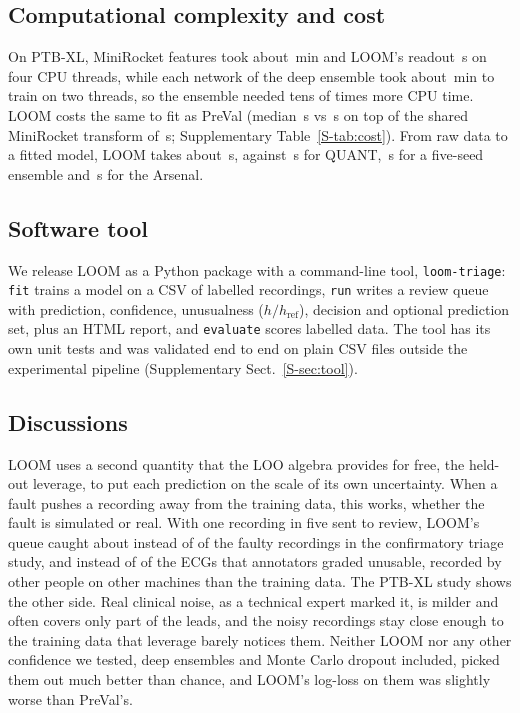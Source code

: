 \documentclass[preprint,12pt,authoryear]{elsarticle}
\begin{document}
\subsection{Computational complexity and cost}\label{sec:cost}
On PTB-XL, MiniRocket features took about \PTBTimeTransform\,min and LOOM's readout \PTBTimeLoom\,s on four CPU threads, while each network of the deep ensemble took about \DeepTrainMin\,min to train on two threads, so the ensemble needed tens of times more CPU time. LOOM costs the same to fit as PreVal (median \FitLoom\,s vs \FitPreVal\,s on top of the shared MiniRocket transform of \FitTransform\,s; Supplementary Table~\ref{S-tab:cost}). From raw data to a fitted model, LOOM takes about \FitEndToEndLoom\,s, against \FitQuant\,s for QUANT, \FitLoomEns\,s for a five-seed ensemble and \FitArsenal\,s for the Arsenal.

\subsection{Software tool}\label{sec:tool}
We release LOOM as a Python package with a command-line tool, \texttt{loom-triage}: \texttt{fit} trains a model on a CSV of labelled recordings, \texttt{run} writes a review queue with prediction, confidence, unusualness ($h/h_{\mathrm{ref}}$), decision and optional prediction set, plus an HTML report, and \texttt{evaluate} scores labelled data. The tool has its own unit tests and was validated end to end on plain CSV files outside the experimental pipeline (Supplementary Sect.~\ref{S-sec:tool}).

\subsection{Discussions}\label{sec:discussion}
LOOM uses a second quantity that the LOO algebra provides for free, the held-out leverage, to put each prediction on the scale of its own uncertainty. When a fault pushes a recording away from the training data, this works, whether the fault is simulated or real. With one recording in five sent to review, LOOM's queue caught about \CCaughtLoom{} instead of \CCaughtPreVal{} of the faulty recordings in the confirmatory triage study, and \CincHTwelveCaughtLoom{} instead of \CincHTwelveCaughtPreVal{} of the ECGs that annotators graded unusable, recorded by other people on other machines than the training data. The PTB-XL study shows the other side. Real clinical noise, as a technical expert marked it, is milder and often covers only part of the leads, and the noisy recordings stay close enough to the training data that leverage barely notices them. Neither LOOM nor any other confidence we tested, deep ensembles and Monte Carlo dropout included, picked them out much better than chance, and LOOM's log-loss on them was slightly worse than PreVal's.
\end{document}
